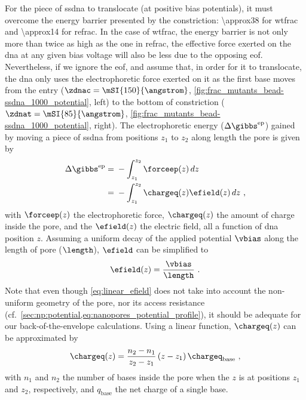 For the piece of \gls{ssdna} to translocate (at positive bias potentials), it must overcome the energy barrier
presented by the constriction: \SI{\approx38}{\kT} for \gls{wtfrac} and \SI{\approx14}{\kT} for \gls{refrac}.
In the case of \gls{wtfrac}, the energy barrier is not only more than twice as high as the one in
\gls{refrac}, the effective force exerted on the \gls{dna} at any given bias voltage will also be less due to
the opposing \gls{eof}. Nevertheless, if we ignore the \gls{eof}, and assume that, in order for it to
translocate, the \gls{dna} only uses the electrophoretic force exerted on it as the first base moves from the
\cisi{} entry ($\zdnac = \mSI{150}{\angstrom}$, \cref{fig:frac_mutants_bead-ssdna_1000_potential}, left) to
the bottom of \transi{} constriction ($\zdnat = \mSI{85}{\angstrom}$,
\cref{fig:frac_mutants_bead-ssdna_1000_potential}, right). The electrophoretic energy ($\Delta
\gibbs^{\textrm{ep}}$) gained by moving a piece of \gls{ssdna} from positions $z_1$ to $z_2$ along length the
pore is given by
%
\begin{align}\label{eq:ep_energy}
  \Delta \gibbs^{\textrm{ep}} ={}& - \int_{z_1}^{z_2} \forceep (z) \,dz \nonumber \\
                              ={}& - \int_{z_1}^{z_2} \chargeq (z) \efield (z) \,dz
  \text{ ,}
\end{align}
%
with $\forceep (z)$ the electrophoretic force, $\chargeq (z)$ the amount of charge inside the pore, and the
$\efield (z)$ the electric field, all a function of \gls{dna} position $z$. Assuming a uniform decay of the
applied potential $\vbias$ along the length of pore ($\length$), $\efield$ can be simplified to
%
\begin{equation}\label{eq:linear_efield}
  \efield (z) = \dfrac{\vbias}{\length}
  \text{ .}
\end{equation}
%
Note that even though \cref{eq:linear_efield} does not take into account the non-uniform geometry of the pore,
nor its access resistance (cf.~\cref{sec:np:potential,eq:nanopores_potential_profile}), it should be adequate
for our back-of-the-envelope calculations. Using a linear function, $\chargeq (z)$ can be approximated by
%
\begin{equation}\label{eq:ssdna_charge_in_pore}
  \chargeq (z) = 
        \dfrac{ n_2 - n_1 } { z_2 - z_1 } 
        \left( z - z_1 \right) \chargeq_{\textrm{base}}
  \text{ ,}
\end{equation}
%
with $n_1$ and $n_2$ the number of bases inside the pore when the $z$ is at positions $z_1$ and $z_2$,
respectively, and $q_{\textrm{base}}$ the net charge of a single base.

